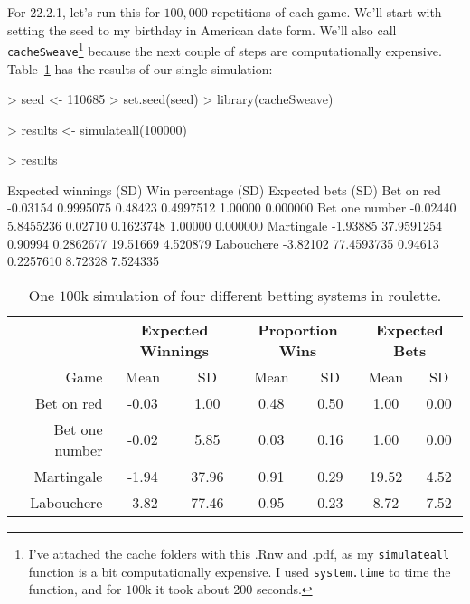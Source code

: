 \documentclass[9pt, oneside, reqno]{article}
\theoremstyle{plain}
\begin{document}
For 22.2.1, let's run this for $100,000$ repetitions of each game. We'll start with setting the seed to my birthday in American date form. We'll also call {\tt cacheSweave}\footnote{I've attached the cache folders with this .Rnw and .pdf, as my {\tt simulateall} function is a bit computationally expensive. I used {\tt system.time} to time the function, and for $100$k it took about 200 seconds.} because the next couple of steps are computationally expensive. Table~\ref{table:onetime} has the results of our single simulation:

\begin{Schunk}
\begin{Sinput}
> seed <- 110685
> set.seed(seed)
> library(cacheSweave)
\end{Sinput}
\end{Schunk}

\begin{Schunk}
\begin{Sinput}
> results <- simulateall(100000)
\end{Sinput}
\end{Schunk}

\begin{Schunk}
\begin{Sinput}
> results
\end{Sinput}
\begin{Soutput}
               Expected winnings       (SD) Win percentage      (SD) Expected bets     (SD)
Bet on red              -0.03154  0.9995075        0.48423 0.4997512       1.00000 0.000000
Bet one number          -0.02440  5.8455236        0.02710 0.1623748       1.00000 0.000000
Martingale              -1.93885 37.9591254        0.90994 0.2862677      19.51669 4.520879
Labouchere              -3.82102 77.4593735        0.94613 0.2257610       8.72328 7.524335
\end{Soutput}
\end{Schunk}

\begin{table}[H]
\begin{center}
\begin{tabular}{rcc|cc|cc}
& \multicolumn{2}{c|}{{\bf Expected Winnings}} & \multicolumn{2}{c|}{{\bf Proportion Wins}} & \multicolumn{2}{c}{{\bf Expected Bets}} \\
Game & Mean & SD & Mean & SD & Mean & SD \\
  \hline
Bet on red & -0.03 & 1.00 & 0.48 & 0.50 & 1.00 & 0.00 \\ 
  Bet one number & -0.02 & 5.85 & 0.03 & 0.16 & 1.00 & 0.00 \\ 
  Martingale & -1.94 & 37.96 & 0.91 & 0.29 & 19.52 & 4.52 \\ 
  Labouchere & -3.82 & 77.46 & 0.95 & 0.23 & 8.72 & 7.52 \\ 
   \hline\end{tabular}
\end{center}
\caption{One $100$k simulation of four different betting systems in roulette.}
\label{table:onetime}
\end{table}
\end{document}
